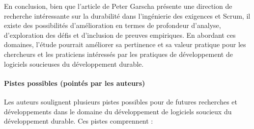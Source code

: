 En conclusion, bien que l'article de Peter Garscha présente une direction de recherche intéressante sur la durabilité dans l'ingénierie des exigences et Scrum, il existe des possibilités d'amélioration en termes de profondeur d'analyse, d'exploration des défis et d'inclusion de preuves empiriques. En abordant ces domaines, l'étude pourrait améliorer sa pertinence et sa valeur pratique pour les chercheurs et les praticiens intéressés par les pratiques de développement de logiciels soucieuses du développement durable.

\paragraph{Pistes possibles (pointés par les auteurs)}
Les auteurs soulignent plusieurs pistes possibles pour de futures recherches et développements dans le domaine du développement de logiciels soucieux du développement durable. Ces pistes comprennent :

